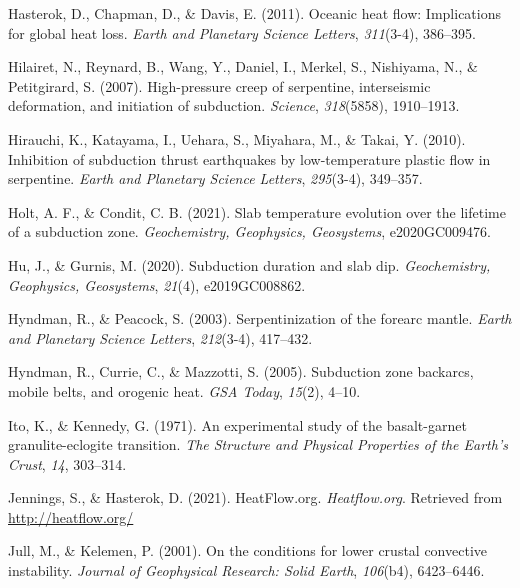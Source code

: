 \begin{CSLReferences}{1}{1}
\leavevmode{}%
Hasterok, D., Chapman, D., \& Davis, E. (2011). Oceanic heat flow: Implications for global heat loss. \emph{Earth and Planetary Science Letters}, \emph{311}(3-4), 386--395.

\leavevmode{}%
Hilairet, N., Reynard, B., Wang, Y., Daniel, I., Merkel, S., Nishiyama, N., \& Petitgirard, S. (2007). High-pressure creep of serpentine, interseismic deformation, and initiation of subduction. \emph{Science}, \emph{318}(5858), 1910--1913.

\leavevmode{}%
Hirauchi, K., Katayama, I., Uehara, S., Miyahara, M., \& Takai, Y. (2010). Inhibition of subduction thrust earthquakes by low-temperature plastic flow in serpentine. \emph{Earth and Planetary Science Letters}, \emph{295}(3-4), 349--357.

\leavevmode{}%
Holt, A. F., \& Condit, C. B. (2021). Slab temperature evolution over the lifetime of a subduction zone. \emph{Geochemistry, Geophysics, Geosystems}, e2020GC009476.

\leavevmode{}%
Hu, J., \& Gurnis, M. (2020). Subduction duration and slab dip. \emph{Geochemistry, Geophysics, Geosystems}, \emph{21}(4), e2019GC008862.

\leavevmode{}%
Hyndman, R., \& Peacock, S. (2003). Serpentinization of the forearc mantle. \emph{Earth and Planetary Science Letters}, \emph{212}(3-4), 417--432.

\leavevmode{}%
Hyndman, R., Currie, C., \& Mazzotti, S. (2005). Subduction zone backarcs, mobile belts, and orogenic heat. \emph{GSA Today}, \emph{15}(2), 4--10.

\leavevmode{}%
Ito, K., \& Kennedy, G. (1971). An experimental study of the basalt-garnet granulite-eclogite transition. \emph{The Structure and Physical Properties of the Earth's Crust}, \emph{14}, 303--314.

\leavevmode{}%
Jennings, S., \& Hasterok, D. (2021). HeatFlow.org. \emph{Heatflow.org}. Retrieved from \url{http://heatflow.org/}

\leavevmode{}%
Jull, M., \& Kelemen, P. (2001). On the conditions for lower crustal convective instability. \emph{Journal of Geophysical Research: Solid Earth}, \emph{106}(b4), 6423--6446.


\end{CSLReferences}
